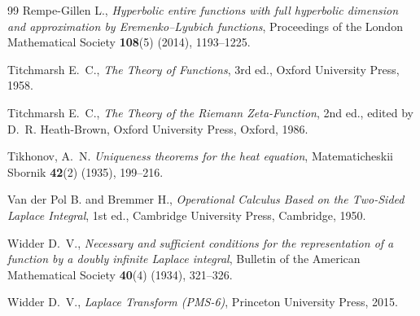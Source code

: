 \documentclass[12pt]{article}
\theoremstyle{definition}
\begin{document}
\begin{thebibliography}{99}
Rempe-Gillen L., \textit{Hyperbolic entire functions with full hyperbolic dimension and approximation by Eremenko--Lyubich functions}, Proceedings of the London Mathematical Society \textbf{108}(5) (2014), 1193–1225.

Titchmarsh E.~C., \textit{The Theory of Functions}, 3rd ed., Oxford University Press, 1958.

Titchmarsh E.~C., \textit{The Theory of the Riemann Zeta-Function}, 2nd ed., edited by D.~R. Heath-Brown, Oxford University Press, Oxford, 1986.

Tikhonov, A.~N. \textit{Uniqueness theorems for the heat equation}, Matematicheskii Sbornik \textbf{42}(2) (1935), 199--216.

Van der Pol B. and Bremmer H., \textit{Operational Calculus Based on the Two-Sided Laplace Integral}, 1st ed., Cambridge University Press, Cambridge, 1950.

Widder D.~V., \textit{Necessary and sufficient conditions for the representation of a function by a doubly infinite Laplace integral}, Bulletin of the American Mathematical Society \textbf{40}(4) (1934), 321--326.

Widder D.~V., \textit{Laplace Transform (PMS-6)}, Princeton University Press, 2015.

\end{thebibliography}
\end{document}
